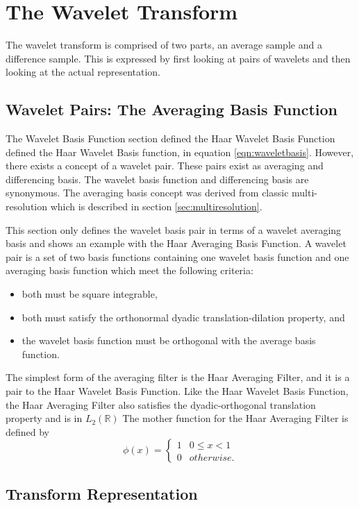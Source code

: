 \section{The Wavelet Transform}

The wavelet transform is comprised of two parts, an average sample and
a difference sample. This is expressed by first looking at pairs of
wavelets and then looking at the actual representation.

\subsection {Wavelet Pairs: The Averaging Basis Function}

The Wavelet Basis Function section defined the Haar Wavelet Basis
Function defined the Haar Wavelet Basis function, in equation
\ref{eqn:waveletbasis}.  However, there exists a concept of a wavelet
pair.  These pairs exist as averaging and differencing basis.  The
wavelet basis function and differencing basis are synonymous.  The
averaging basis concept was derived from classic multi-resolution
which is described in section \ref{sec:multiresolution}.

This section only defines the wavelet basis pair in terms of a wavelet
averaging basis and shows an example with the Haar Averaging Basis
Function.  A wavelet pair is a set of two basis functions containing
one wavelet basis function and one averaging basis function which meet
the following criteria:
\begin{itemize}
\item both must be square integrable, 
\item both must satisfy the orthonormal dyadic translation-dilation property, and
\item the wavelet basis function must be orthogonal with the average basis function.
\end{itemize}
The simplest form of the averaging filter is the Haar Averaging
Filter, and it is a pair to the Haar Wavelet Basis Function.  Like the
Haar Wavelet Basis Function, the Haar Averaging Filter also satisfies
the dyadic-orthogonal translation property and is in $L_2({\mathbb R})$ The
mother \cite{walker,victor,ChuiIntro,tabor,graps} function for the Haar Averaging Filter is defined by
\[
\phi(x) =
\left\{\begin{array}{cc}1 & 0\le x < 1 \\0 &
{otherwise.}\end{array}\right.
\]

\subsection{Transform Representation}

